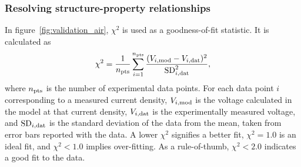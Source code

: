 \documentclass[final,3p,times,twocolumn]{elsarticle}    %
\begin{document}
\subsubsection{Resolving structure-property relationships}
\label{sect:structure_prop_results}
In figure~\ref{fig:validation_air}, $\chi^2$ is used as a goodness-of-fit statistic. It is calculated as
\begin{equation}
    \chi^2 = \frac{1}{n_{\rm pts}} \sum_{i=1}^{n_{\rm pts}} 
             \frac{(V_{i,\rm mod} - V_{i,\rm dat})^2}{{\rm SD}_{i,\rm dat}^2},
\end{equation}
where $n_{\rm pts}$ is the number of experimental data points. For each data point $i$ corresponding to a measured current density, $V_{i,\rm mod}$ is the voltage calculated in the model at that current density, $V_{i,\rm dat}$ is the experimentally measured voltage, and ${\rm SD}_{i,\rm dat}$ is the standard deviation of the data from the mean, taken from error bars reported with the data. A lower $\chi^2$ signifies a better fit, $\chi^2 = 1.0$ is an ideal fit, and $\chi^2 < 1.0$ implies over-fitting. As a rule-of-thumb, $\chi^2 < 2.0$ indicates a good fit to the data. 
\end{document}
